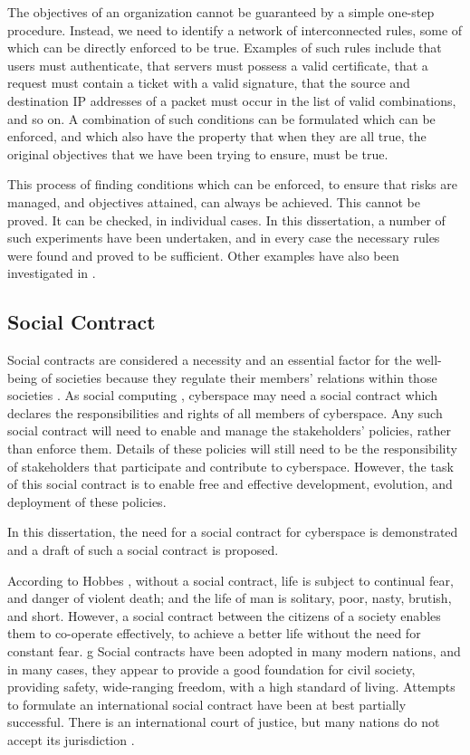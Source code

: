 The objectives of an organization cannot be guaranteed by a simple
one-step procedure. Instead, we need to identify a network of
interconnected rules, some of which can be directly enforced to be
true. Examples of such rules include that users must authenticate, that
servers must possess a valid certificate, that a request must contain
a ticket with a valid signature, that the source and destination IP
addresses of a packet must occur in the list of valid combinations, and
so on. A combination of such conditions can be formulated which can be
enforced, and which also have the property that when they are all true,
the original objectives that we have been trying to ensure, must be true.

This process of finding conditions which can be enforced, to ensure
that risks are managed, and objectives attained, can always be
achieved. This cannot be proved. It can be checked, in individual
cases. In this dissertation,  a number of such experiments have been
undertaken, and in every case the necessary rules were found and
proved to be sufficient. Other examples have also been investigated in
 \cite{sheniar2018experiments,sheniar2019Graph}.

 
\subsection{Social Contract}
Social contracts are considered a necessity and an essential factor for the well-being of societies because they regulate their members' relations within those societies \cite{Leviathan}. As social computing \cite{parameswaran2007social}, cyberspace may need a social contract which declares the responsibilities and rights of all members of cyberspace. Any such social contract will need to enable and manage the stakeholders' policies, rather than enforce them. Details of these policies will still need to be the responsibility of stakeholders that participate and contribute to cyberspace. However, the task of this social contract is to enable free and effective development, evolution, and deployment of these policies. 

In this dissertation, the need for a social contract for cyberspace is demonstrated and a draft of such a social contract is proposed. 

\if 
According to Hobbes \cite{Leviathan}, without a social contract, life is subject to continual fear, and danger of violent death; and the life of man is solitary, poor, nasty, brutish, and short. 
However, a social contract between the citizens of a society enables them to co-operate effectively, to achieve a better life without the need for constant fear.
g
Social contracts have been adopted in many modern nations, and in many cases, they appear to provide a good foundation for civil society, providing safety, wide-ranging freedom, with a high standard of living. Attempts to formulate an international social contract have been at best partially successful. There is an international court of justice, but many nations do not accept its jurisdiction \cite{Robertson}.

